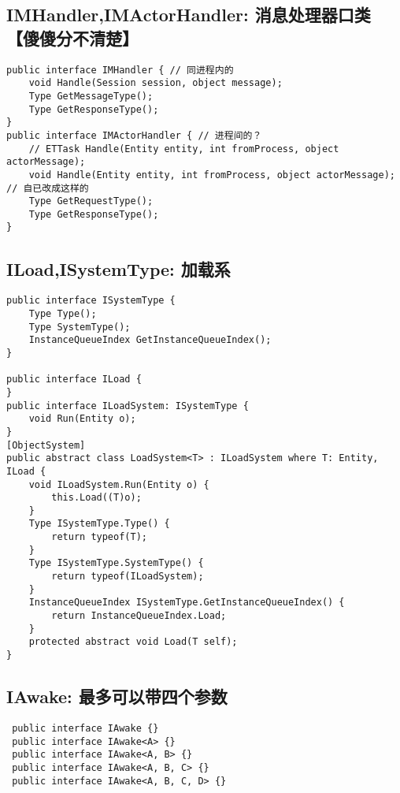 \documentclass[9pt, b5paper]{article}
\begin{document}
\subsection{IMHandler,IMActorHandler: 消息处理器口类【傻傻分不清楚】}
\label{sec-1-4}
\begin{verbatim}
public interface IMHandler { // 同进程内的
    void Handle(Session session, object message);
    Type GetMessageType();
    Type GetResponseType();
}
public interface IMActorHandler { // 进程间的？
    // ETTask Handle(Entity entity, int fromProcess, object actorMessage);
    void Handle(Entity entity, int fromProcess, object actorMessage); // 自已改成这样的
    Type GetRequestType();
    Type GetResponseType();
}
\end{verbatim}
\subsection{ILoad,ISystemType: 加载系}
\label{sec-1-5}
\begin{verbatim}
public interface ISystemType {
    Type Type();
    Type SystemType();
    InstanceQueueIndex GetInstanceQueueIndex();
}

public interface ILoad {
}
public interface ILoadSystem: ISystemType {
    void Run(Entity o);
}
[ObjectSystem]
public abstract class LoadSystem<T> : ILoadSystem where T: Entity, ILoad {
    void ILoadSystem.Run(Entity o) {
        this.Load((T)o);
    }
    Type ISystemType.Type() {
        return typeof(T);
    }
    Type ISystemType.SystemType() {
        return typeof(ILoadSystem);
    }
    InstanceQueueIndex ISystemType.GetInstanceQueueIndex() {
        return InstanceQueueIndex.Load;
    }
    protected abstract void Load(T self);
}
\end{verbatim}
\subsection{IAwake: 最多可以带四个参数}
\label{sec-1-6}
\begin{verbatim}
 public interface IAwake {}
 public interface IAwake<A> {}
 public interface IAwake<A, B> {}
 public interface IAwake<A, B, C> {}
 public interface IAwake<A, B, C, D> {}
\end{verbatim}
\end{document}
